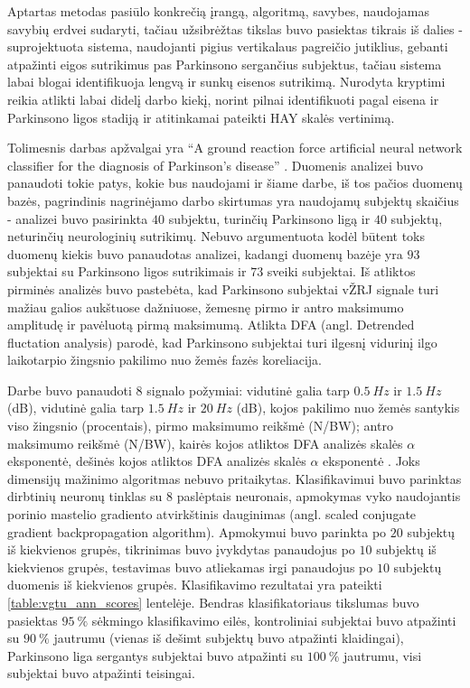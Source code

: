 \documentclass[]{vgtuef}
\begin{document}
Aptartas metodas pasiūlo konkrečią įrangą, algoritmą, savybes, naudojamas savybių erdvei sudaryti, tačiau užsibrėžtas tikslas buvo pasiektas tikrais iš dalies - suprojektuota sistema, naudojanti pigius vertikalaus pagreičio jutiklius, gebanti atpažinti eigos sutrikimus pas Parkinsono sergančius subjektus, tačiau sistema labai blogai identifikuoja lengvą ir sunkų eisenos sutrikimą. Nurodyta kryptimi reikia atlikti labai didelį darbo kiekį, norint pilnai identifikuoti pagal eisena ir Parkinsono ligos stadiją ir atitinkamai pateikti HAY skalės vertinimą.


Tolimesnis darbas apžvalgai yra ``A ground reaction force artificial neural network classifier for the diagnosis of Parkinson's disease'' \cite{vgtu}. Duomenis analizei buvo panaudoti tokie patys, kokie bus naudojami ir šiame darbe, iš tos pačios duomenų bazės, pagrindinis nagrinėjamo darbo skirtumas yra naudojamų subjektų skaičius - analizei buvo pasirinkta $40$ subjektu, turinčių Parkinsono ligą ir $40$ subjektų, neturinčių neurologinių sutrikimų. Nebuvo argumentuota kodėl būtent toks duomenų kiekis buvo panaudotas analizei, kadangi duomenų bazėje yra $93$ subjektai su Parkinsono ligos sutrikimais ir $73$ sveiki subjektai. Iš atliktos pirminės analizės buvo pastebėta, kad Parkinsono subjektai vŽRJ signale turi mažiau galios aukštuose dažniuose, žemesnę pirmo ir antro maksimumo amplitudę ir pavėluotą pirmą maksimumą. Atlikta DFA (angl. Detrended fluctation analysis) parodė, kad Parkinsono subjektai turi ilgesnį vidurinį ilgo laikotarpio žingsnio pakilimo nuo žemės fazės koreliacija.

Darbe buvo panaudoti 8 signalo požymiai: vidutinė galia tarp $0.5~Hz$ ir $1.5~Hz$ (dB), vidutinė galia tarp $1.5~Hz$ ir $20~Hz$ (dB), kojos pakilimo nuo žemės santykis viso žingsnio (procentais), pirmo maksimumo reikšmė (N/BW); antro maksimumo reikšmė (N/BW), kairės kojos atliktos DFA analizės skalės $\alpha$ eksponentė, dešinės kojos atliktos DFA analizės skalės $\alpha$ eksponentė \cite{Hausdorff01011997}. Joks dimensijų mažinimo algoritmas nebuvo pritaikytas. Klasifikavimui buvo parinktas dirbtinių neuronų tinklas su 8 paslėptais neuronais, apmokymas vyko naudojantis porinio mastelio gradiento atvirkštinis dauginimas (angl. scaled conjugate gradient backpropagation algorithm). Apmokymui buvo parinkta po $20$ subjektų iš kiekvienos grupės, tikrinimas buvo įvykdytas panaudojus po $10$ subjektų iš kiekvienos grupės, testavimas buvo atliekamas irgi panaudojus po $10$ subjektų duomenis iš kiekvienos grupės. Klasifikavimo rezultatai yra pateikti \ref{table:vgtu_ann_scores} lentelėje. Bendras klasifikatoriaus tikslumas buvo pasiektas $95~\%$ sėkmingo klasifikavimo eilės, kontroliniai subjektai buvo atpažinti su $90~\%$ jautrumu (vienas iš dešimt subjektų buvo atpažinti klaidingai), Parkinsono liga sergantys subjektai buvo atpažinti su $100~\%$ jautrumu, visi subjektai buvo atpažinti teisingai.
\end{document}
